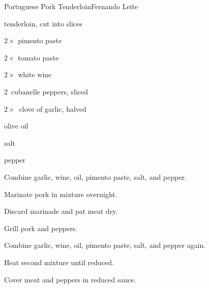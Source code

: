 \begin{recipe}{Portuguese Pork Tenderloin}{Fernando Leite}{}

\begin{ingredients}
\item {} tenderloin, cut into slices
\item $2\times$ pimento paste
\item $2\times$ tomato paste
\item $2\times$\C{\third} white wine
\item 2~cubanelle peppers, sliced
\item $2\times$~clove of garlic, halved
\item olive oil
\item salt
\item pepper
\end{ingredients}

\begin{directions}
\item Combine garlic, wine, oil, pimento paste, salt, and pepper.
\item Marinate pork in mixture overnight.
\item Discard marinade and pat meat dry.
\item Grill pork and peppers.
\item Combine garlic, wine, oil, pimento paste, salt, and pepper again.
\item Heat second mixture until reduced.
\item Cover meat and peppers in reduced sauce.
\end{directions}

\end{recipe}
